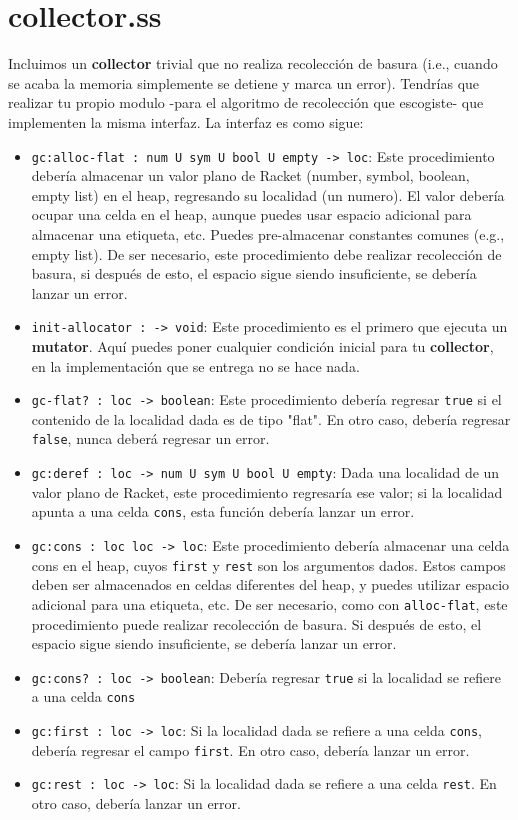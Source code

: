 \documentclass{article}
\begin{document}
\section*{collector.ss}
Incluimos un \textbf{collector} trivial que no realiza recolección de basura (i.e., cuando se acaba la memoria
simplemente se detiene y marca un error). Tendrías que realizar tu propio modulo -para el algoritmo de recolección
que escogiste- que implementen la misma interfaz. La interfaz es como sigue:

\begin{itemize}
\item \verb;gc:alloc-flat : num U sym U bool U empty -> loc;: Este procedimiento debería almacenar un valor
  plano de Racket (number, symbol, boolean, empty list) en el heap, regresando su localidad (un numero). El valor
  debería ocupar una celda en el heap, aunque puedes usar espacio adicional para almacenar una etiqueta, etc.
  Puedes pre-almacenar constantes comunes (e.g., empty list). De ser necesario, este procedimiento debe
  realizar recolección de basura, si después de esto, el espacio sigue siendo insuficiente, se debería lanzar
  un error.
\item \verb;init-allocator : -> void;: Este procedimiento es el primero que ejecuta un \textbf{mutator}. Aquí
  puedes poner cualquier condición inicial para tu \textbf{collector}, en la implementación que se entrega no se
  hace nada.
\item \verb;gc-flat? : loc -> boolean;: Este procedimiento debería regresar \verb;true; si el contenido de la
  localidad dada es de tipo "flat". En otro caso, debería regresar \verb;false;, nunca deberá regresar un error.
\item \verb;gc:deref : loc -> num U sym U bool U empty;: Dada una localidad de un valor plano de Racket,
  este procedimiento regresaría ese valor; si la localidad apunta a una celda \verb;cons;, esta función debería
  lanzar un error.
\item \verb;gc:cons : loc loc -> loc;: Este procedimiento debería almacenar una celda cons en el heap, cuyos
  \verb;first; y \verb;rest; son los argumentos dados. Estos campos deben ser almacenados en celdas diferentes
  del heap, y puedes utilizar espacio adicional para una etiqueta, etc. De ser necesario, como con
  \verb;alloc-flat;, este procedimiento puede realizar recolección de basura. Si después de esto, el espacio sigue siendo insuficiente, se debería lanzar un error.
\item \verb;gc:cons? : loc -> boolean;: Debería regresar \verb;true; si la localidad se refiere a una celda
  \verb;cons;
\item \verb;gc:first : loc -> loc;: Si la localidad dada se refiere a una celda \verb;cons;, debería regresar
  el campo \verb;first;. En otro caso, debería lanzar un error.
\item \verb;gc:rest : loc -> loc;: Si la localidad dada se refiere a una celda \verb;rest;. En otro caso, debería
  lanzar un error.
\end{itemize}
\end{document}

